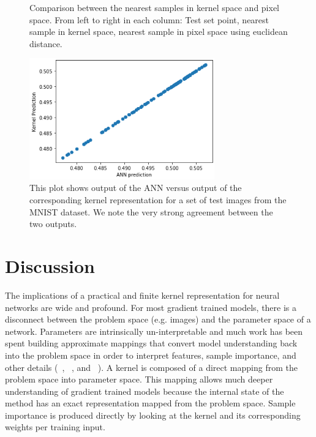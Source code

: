 \begin{figure}
\begin{minipage}{0.2\textwidth}
            \captionsetup{labelformat=empty}
            \addtocounter{figure}{-1}
        \end{minipage}
      \caption{Comparison between the nearest samples in kernel space and pixel space. From left to right in each column: Test set point, nearest sample in kernel space, nearest sample in pixel space using euclidean distance.}
      \label{fig:near}
    \end{figure}
    

\begin{figure}[!h]
\centering
\includegraphics[width=8cm]{c3_figures/image.png}
\caption{This plot shows output of the ANN versus output of the corresponding kernel representation for a set of test images from the MNIST dataset. We note the very strong agreement between the two outputs.}  
\label{fig:agree}
\end{figure}




\section{Discussion}

The implications of a practical and finite kernel representation for neural networks are wide and profound. For most gradient trained models, there is a disconnect between the problem space (e.g. images) and the parameter space of a network. Parameters are intrinsically un-interpretable and much work has been spent building approximate mappings that convert model understanding back into the problem space in order to interpret features, sample importance, and other details (~\cite{simonyan2013deep}, ~\cite{lundberg2017unified}, and ~\cite{Selvaraju_2019}). A kernel is composed of a direct mapping from the problem space into parameter space. This mapping allows much deeper understanding of gradient trained models because the internal state of the method has an exact representation mapped from the problem space. Sample importance is produced directly by looking at the kernel and its corresponding weights per training input. 


